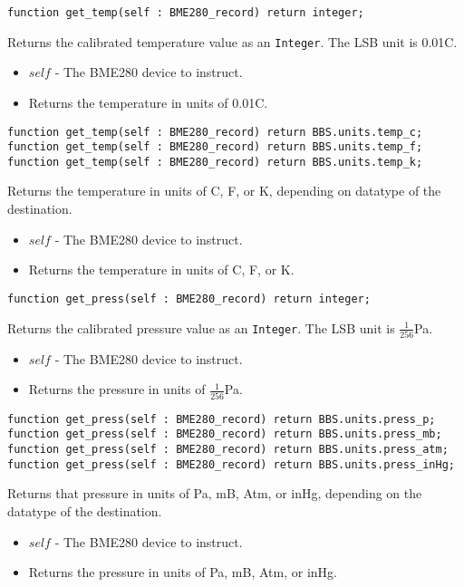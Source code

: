 \documentclass[10pt, openany]{book}
\newcommand{\datatype}[1]{\texttt{#1}}
\begin{document}
\begin{lstlisting}
function get_temp(self : BME280_record) return integer;
\end{lstlisting}
Returns the calibrated temperature value as an \datatype{Integer}.  The LSB unit is 0.01\degree{}C.
\begin{itemize}
  \item $self$ - The BME280 device to instruct.
  \item Returns the temperature in units of 0.01\degree{}C.
\end{itemize}

\begin{lstlisting}
function get_temp(self : BME280_record) return BBS.units.temp_c;
function get_temp(self : BME280_record) return BBS.units.temp_f;
function get_temp(self : BME280_record) return BBS.units.temp_k;
\end{lstlisting}
Returns the temperature in units of \degree{}C, \degree{}F, or K, depending on datatype of the destination.
\begin{itemize}
  \item $self$ - The BME280 device to instruct.
  \item Returns the temperature in units of \degree{}C, \degree{}F, or K.
\end{itemize}

\begin{lstlisting}
function get_press(self : BME280_record) return integer;
\end{lstlisting}
Returns the calibrated pressure value as an \datatype{Integer}.  The LSB unit is $\frac{1}{256}$Pa.
\begin{itemize}
  \item $self$ - The BME280 device to instruct.
  \item Returns the pressure in units of $\frac{1}{256}$Pa.
\end{itemize}

\begin{lstlisting}
function get_press(self : BME280_record) return BBS.units.press_p;
function get_press(self : BME280_record) return BBS.units.press_mb;
function get_press(self : BME280_record) return BBS.units.press_atm;
function get_press(self : BME280_record) return BBS.units.press_inHg;
\end{lstlisting}
Returns that pressure in units of Pa, mB, Atm, or inHg, depending on the datatype of the destination.
\begin{itemize}
  \item $self$ - The BME280 device to instruct.
  \item Returns the pressure in units of Pa, mB, Atm, or inHg.
\end{itemize}
\end{document}
